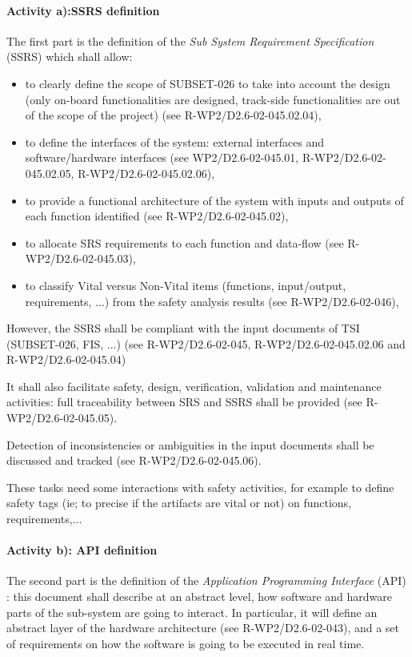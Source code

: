 \paragraph{Activity a):SSRS definition} The first part is the definition of the  \emph{Sub System Requirement Specification} (SSRS) which shall allow:
\begin{itemize}
\item to clearly define the scope of SUBSET-026 to take into account the design (only on-board functionalities are designed, track-side functionalities are out of the scope of the project) (see R-WP2/D2.6-02-045.02.04),
\item to define the interfaces of the system: external interfaces and software/hardware interfaces (see WP2/D2.6-02-045.01, R-WP2/D2.6-02-045.02.05, R-WP2/D2.6-02-045.02.06),
\item to provide a functional architecture of the system with inputs and outputs of each function identified (see R-WP2/D2.6-02-045.02),
\item to allocate SRS requirements to each function and data-flow (see R-WP2/D2.6-02-045.03),
\item to classify Vital versus Non-Vital items (functions, input/output, requirements, ...) from the safety analysis results (see R-WP2/D2.6-02-046),
\end{itemize}

However, the SSRS shall be compliant with the input documents of TSI (SUBSET-026, FIS, ...) (see R-WP2/D2.6-02-045, R-WP2/D2.6-02-045.02.06 and R-WP2/D2.6-02-045.04)

It shall also facilitate safety, design, verification, validation and maintenance activities: full traceability between SRS and SSRS shall be provided (see R-WP2/D2.6-02-045.05).

Detection of inconsistencies or ambiguities in the input documents shall be discussed and tracked (see R-WP2/D2.6-02-045.06).

These tasks need some interactions with safety activities, for example to define safety tags (ie; to precise if the artifacts are vital or not) on functions, requirements,...

\paragraph{Activity b): API definition} The second part is the definition of the \textit{Application Programming Interface} (API) : this document shall describe at an abstract level, how software and hardware parts of the sub-system are going to interact.
In particular, it will define an abstract layer of the hardware architecture (see R-WP2/D2.6-02-043), and a set of requirements on how the software is going to be executed in real time.

